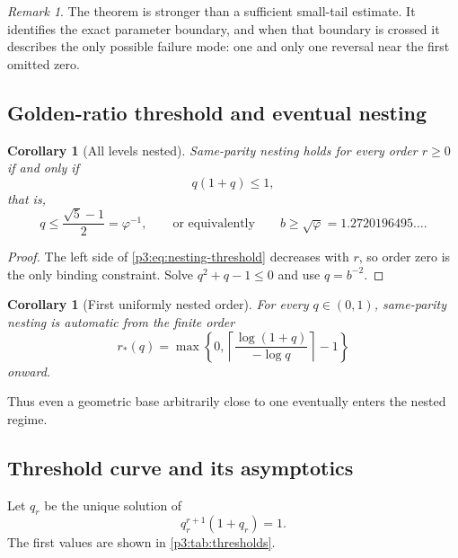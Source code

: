 \documentclass[11pt]{article}
\numberwithin{equation}{section}
\newtheorem{corollary}[theorem]{Corollary}
\theoremstyle{definition}
\theoremstyle{remark}
\newtheorem{remark}[theorem]{Remark}
\begin{document}
\begin{remark}
The theorem is stronger than a sufficient small-tail estimate.  It identifies the exact
parameter boundary, and when that boundary is crossed it describes the only possible
failure mode: one and only one reversal near the first omitted zero.
\end{remark}

\subsection{Golden-ratio threshold and eventual nesting}

\begin{corollary}[All levels nested]\label{p3:cor:golden-threshold}
Same-parity nesting holds for every order $r\ge0$ if and only if
\begin{equation}
 q(1+q)\le1,
 \end{equation}
that is,
\begin{equation}
 q\le\frac{\sqrt5-1}{2}=\varphi^{-1},
 \qquad\text{or equivalently}\qquad
 b\ge\sqrt\varphi=1.2720196495\ldots.
 \label{p3:eq:golden-base}
\end{equation}
\end{corollary}

\begin{proof}
The left side of \eqref{p3:eq:nesting-threshold} decreases with $r$, so order zero is the only
binding constraint.  Solve $q^2+q-1\le0$ and use $q=b^{-2}$.
\end{proof}

\begin{corollary}[First uniformly nested order]\label{p3:cor:first-order}
For every $q\in(0,1)$, same-parity nesting is automatic from the finite order
\begin{equation}
 r_*(q)=\max\!\left\{0,
 \left\lceil\frac{\log(1+q)}{-\log q}\right\rceil-1\right\}
 \label{p3:eq:rstar}
\end{equation}
onward.
\end{corollary}

Thus even a geometric base arbitrarily close to one eventually enters the nested regime.

\subsection{Threshold curve and its asymptotics}

Let $q_r$ be the unique solution of
\begin{equation}
 q_r^{r+1}(1+q_r)=1.
 \label{p3:eq:qrdef}
\end{equation}
The first values are shown in \cref{p3:tab:thresholds}.
\end{document}
